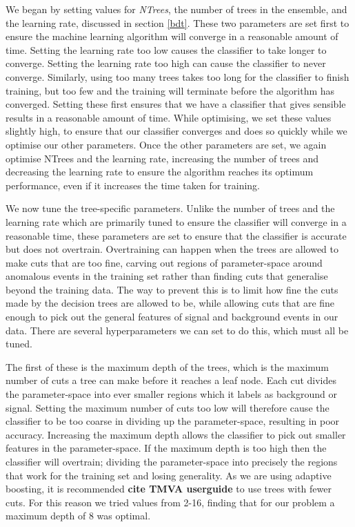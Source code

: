 \documentclass[11pt]{cuthesis}
\begin{document}
We began by setting values for \textit{NTrees}, the number of trees in the ensemble, and the learning rate, discussed in section \ref{bdt}. These two parameters are set first to ensure the machine learning algorithm will converge in a reasonable amount of time. Setting the learning rate  too low causes the classifier to take longer to converge. Setting the learning rate too high can cause the classifier to never converge. Similarly, using too many trees takes too long for the classifier to finish training, but too few and the training will terminate before the algorithm has converged. Setting these first ensures that we have a classifier that gives sensible results in a reasonable amount of time. While optimising, we set these values slightly high, to ensure that our classifier converges and does so quickly while we optimise our other parameters. Once the other parameters are set, we again optimise NTrees and the learning rate, increasing the number of trees and decreasing the learning rate to ensure the algorithm reaches its optimum performance, even if it increases the time taken for training.

We now tune the tree-specific parameters. Unlike the number of trees and the learning rate which are primarily tuned to ensure the classifier will converge in a reasonable time, these parameters are set to ensure that the classifier is accurate but does not overtrain. Overtraining can happen when the trees are allowed to make cuts that are too fine, carving out regions of parameter-space around anomalous events in the training set rather than finding cuts that generalise beyond the training data. The way to prevent this is to limit how fine the cuts made by the decision trees are allowed to be, while allowing cuts that are fine enough to pick out the general features of signal and background events in our data. There are several hyperparameters we can set to do this, which must all be tuned. 

The first of these is the maximum depth of the trees, which is the maximum number of cuts a tree can make before it reaches a leaf node. Each cut divides the parameter-space into ever smaller regions which it labels as background or signal. Setting the maximum number of cuts too low will therefore cause the classifier to be too coarse in dividing up the parameter-space, resulting in poor accuracy. Increasing the maximum depth allows the classifier to pick out smaller features in the parameter-space. If the maximum depth is too high then the classifier will overtrain; dividing the parameter-space into precisely the regions that work for the training set and losing generality. As we are using adaptive boosting, it is recommended \textbf{cite TMVA userguide} to use trees with fewer cuts. For this reason we tried values from 2-16, finding that for our problem a maximum depth of 8 was optimal. 
\end{document}
